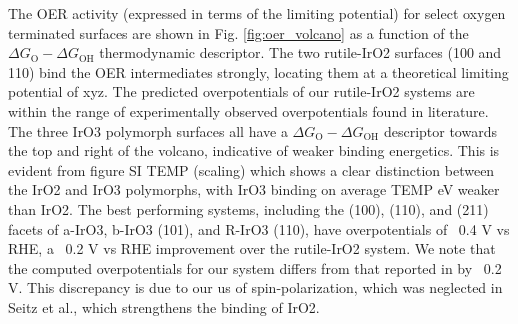 The OER activity (expressed in terms of the limiting potential) for select oxygen terminated surfaces are shown in Fig. \ref{fig:oer_volcano} as a function of the $\Delta G_\mathrm{O} - \Delta G_\mathrm{OH}$ thermodynamic descriptor.
%
The two rutile-IrO2 surfaces (100 and 110) bind the OER intermediates strongly, locating them at a theoretical limiting potential of xyz.
%
The predicted overpotentials of our rutile-IrO2 systems are within the range of experimentally observed overpotentials found in literature.
%
The three IrO3 polymorph surfaces all have a $\Delta G_\mathrm{O} - \Delta G_\mathrm{OH}$ descriptor towards the top and right of the volcano, indicative of weaker binding energetics.
%
This is evident from figure SI TEMP (scaling) which shows a clear distinction between the IrO2 and IrO3 polymorphs, with IrO3 binding on average TEMP eV weaker than IrO2.
%
The best performing systems, including the (100), (110), and (211) facets of a-IrO3, b-IrO3 (101), and R-IrO3 (110), have overpotentials of ~0.4 V vs RHE,
a ~0.2 V vs RHE improvement over the rutile-IrO2 system.
%
We note that the computed  overpotentials for our \rIrOtwo system differs from that reported in \cite{Seitz2016} by ~0.2 V. This discrepancy is due to our us of spin-polarization, which was neglected in Seitz et al., which strengthens the binding of IrO2.




